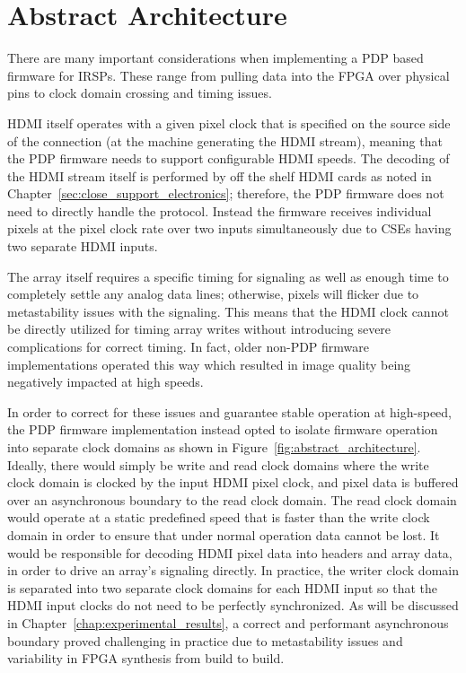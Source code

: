 \section{Abstract Architecture}
    There are many important considerations when implementing a PDP based firmware for IRSPs. These range from pulling data into the FPGA over physical pins to clock domain crossing and timing issues.

    HDMI itself operates with a given pixel clock that is specified on the source side of the connection (at the machine generating the HDMI stream), meaning that the PDP firmware needs to support configurable HDMI speeds. The decoding of the HDMI stream itself is performed by off the shelf HDMI cards as noted in Chapter~\ref{sec:close_support_electronics}; therefore, the PDP firmware does not need to directly handle the protocol. Instead the firmware receives individual pixels at the pixel clock rate over two inputs simultaneously due to CSEs having two separate HDMI inputs.

    The array itself requires a specific timing for signaling as well as enough time to completely settle any analog data lines; otherwise, pixels will flicker due to metastability issues with the signaling. This means that the HDMI clock cannot be directly utilized for timing array writes without introducing severe complications for correct timing. In fact, older non-PDP firmware implementations operated this way which resulted in image quality being negatively impacted at high speeds.

     In order to correct for these issues and guarantee stable operation at high-speed, the PDP firmware implementation instead opted to isolate firmware operation into separate clock domains as shown in Figure~\ref{fig:abstract_architecture}. Ideally, there would simply be write and read clock domains where the write clock domain is clocked by the input HDMI pixel clock, and pixel data is buffered over an asynchronous boundary to the read clock domain. The read clock domain would operate at a static predefined speed that is faster than the write clock domain in order to ensure that under normal operation data cannot be lost. It would be responsible for decoding HDMI pixel data into headers and array data, in order to drive an array's signaling directly. In practice, the writer clock domain is separated into two separate clock domains for each HDMI input so that the HDMI input clocks do not need to be perfectly synchronized. As will be discussed in Chapter~\ref{chap:experimental_results}, a correct and performant asynchronous boundary proved challenging in practice due to metastability issues and variability in FPGA synthesis from build to build.

